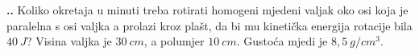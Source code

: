 

\noindent 
\textbf{
\thecjelina.\thezadatak.}
Koliko okretaja u minuti treba rotirati homogeni mjedeni valjak oko osi koja je paralelna s osi valjka a prolazi kroz pla\v{s}t, da bi mu kineti\v{c}ka energija rotacije bila $40\ J$? Visina valjka je $30\ cm$, a polumjer $10\ cm$. Gustoća mjedi je $8,5\ g/cm^3$.


